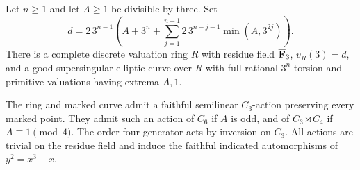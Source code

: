 \begin{lemma}\label{lem:wild-arc}
Let $n\ge1$ and let $A\ge1$ be divisible by three. Set
\begin{equation}\label{eq:arc-degree}
 d=2\,3^{n-1}\left(A+3^n+
            \sum_{j=1}^{n-1}2\,3^{n-j-1}\min(A,3^{2j})\right).
\end{equation}
There is a complete discrete valuation ring $R$ with residue field $\overline{\mathbf F}_3$, $v_R(3)=d$, and a good supersingular elliptic curve over $R$ with full rational $3^n$-torsion and primitive valuations having extrema $A,1$.

The ring and marked curve admit a faithful semilinear $C_3$-action preserving every marked point. They admit such an action of $C_6$ if $A$ is odd, and of $C_3\rtimes C_4$ if $A\equiv1\pmod4$. The order-four generator acts by inversion on $C_3$. All actions are trivial on the residue field and induce the faithful indicated automorphisms of $y^2=x^3-x$.
\end{lemma}

